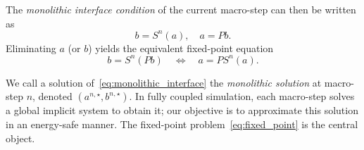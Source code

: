 The \emph{monolithic interface condition} of the current macro-step can then be written as
\begin{equation}
b = S^n(a), \quad a = P b.
\label{eq:monolithic_interface}
\end{equation}
Eliminating $a$ (or $b$) yields the equivalent fixed-point equation
\begin{equation}
b = S^n(P b) \quad \Longleftrightarrow \quad a = P S^n(a).
\label{eq:fixed_point}
\end{equation}

We call a solution of~\eqref{eq:monolithic_interface} the \emph{monolithic solution} at macro-step $n$, denoted $(a^{n,\star}, b^{n,\star})$. In fully coupled simulation, each macro-step solves a global implicit system to obtain it; our objective is to approximate this solution in an energy-safe manner. The fixed-point problem~\eqref{eq:fixed_point} is the central object.
